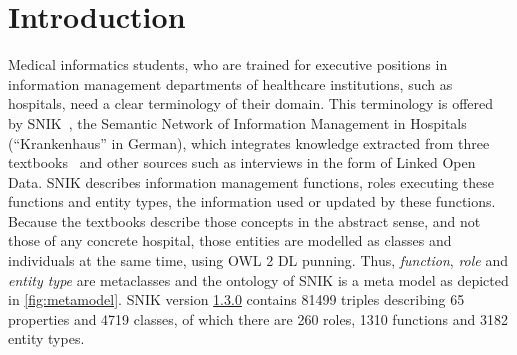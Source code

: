 \documentclass{IOS-Book-Article}     %
\newcommand{\citep}{\cite}%
\newcommand{\snikversion}{1.3.0}
\newcommand{\snikversionlink}{\href{https://github.com/snikproject/ontology/releases/tag/\snikversion}{\snikversion}}
\newcommand{\sniktriples}{\num{81499}}
\newcommand{\snikclasses}{\num{4719}}
\newcommand{\snikroles}{260}
\newcommand{\snikfunctions}{\num{1310}}
\newcommand{\snikentitytypes}{\num{3182}}
\newcommand{\snikproperties}{65}
\begin{document}
\section{Introduction}
Medical informatics students, who are trained for executive positions in information management departments of healthcare institutions, such as hospitals, need a clear terminology of their domain.
This terminology is offered by SNIK~\citep{semantischesnetz,sniktec}, the Semantic Network of Information Management in Hospitals (\enquote{Krankenhaus} in German), which integrates knowledge extracted from three textbooks~\citep{bb,ob,he} and other sources such as interviews in the form of Linked Open Data.
SNIK describes information management functions, roles executing these functions and entity types, the information used or updated by these functions.
Because the textbooks describe those concepts in the abstract sense, and not those of any concrete hospital, those entities are modelled as classes and individuals at the same time, using OWL 2 DL punning.
Thus, \emph{function}, \emph{role} and \emph{entity type} are metaclasses and the ontology of SNIK is a meta model as depicted in \cref{fig:metamodel}.
SNIK version \snikversionlink{} contains \sniktriples{} triples describing \snikproperties{} properties and \snikclasses{} classes, of which there are \snikroles{} roles, \snikfunctions{} functions and \snikentitytypes{} entity types.
\end{document}
